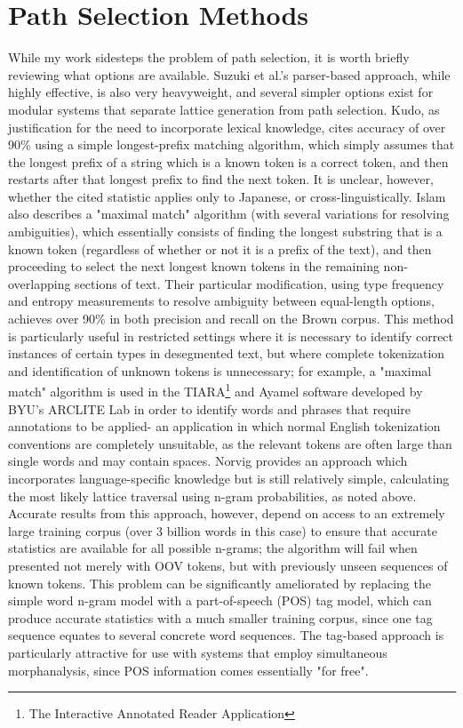 \section{Path Selection Methods}
While my work sidesteps the problem of path selection, it is worth briefly reviewing what options are available. Suzuki et al.'s\cite{suzuki00} parser-based approach, while highly effective, is also very heavyweight, and several simpler options exist for modular systems that separate lattice generation from path selection. Kudo\cite{kudo04}, as justification for the need to incorporate lexical knowledge, cites accuracy of over 90\% using a simple longest-prefix matching algorithm, which simply assumes that the longest prefix of a string which is a known token is a correct token, and then restarts after that longest prefix to find the next token. It is unclear, however, whether the cited statistic applies only to Japanese, or cross-linguistically. Islam\cite{islam07} also describes a "maximal match" algorithm (with several variations for resolving ambiguities), which essentially consists of finding the longest substring that is a known token (regardless of whether or not it is a prefix of the text), and then proceeding to select the next longest known tokens in the remaining non-overlapping sections of text. Their particular modification, using type frequency and entropy measurements to resolve ambiguity between equal-length options, achieves over 90\% in both precision and recall on the Brown corpus. This method is particularly useful in restricted settings where it is necessary to identify correct instances of certain types in desegmented text, but where complete tokenization and identification of unknown tokens is unnecessary; for example, a "maximal match" algorithm is used in the TIARA\footnote{The Interactive Annotated Reader Application} and Ayamel software developed by BYU's ARCLITE Lab in order to identify words and phrases that require annotations to be applied- an application in which normal English tokenization conventions are completely unsuitable, as the relevant tokens are often large than single words and may contain spaces.
Norvig\cite{norvig14} provides an approach which incorporates language-specific knowledge but is still relatively simple, calculating the most likely lattice traversal using n-gram probabilities, as noted above. Accurate results from this approach, however, depend on access to an extremely large training corpus (over 3 billion words in this case) to ensure that accurate statistics are available for all possible n-grams; the algorithm will fail when presented not merely with OOV tokens, but with previously unseen sequences of known tokens. This problem can be significantly ameliorated by replacing the simple word n-gram model with a part-of-speech (POS) tag model, which can produce accurate statistics with a much smaller training corpus, since one tag sequence equates to several concrete word sequences. The tag-based approach is particularly attractive for use with systems that employ simultaneous morphanalysis, since POS information comes essentially "for free".

